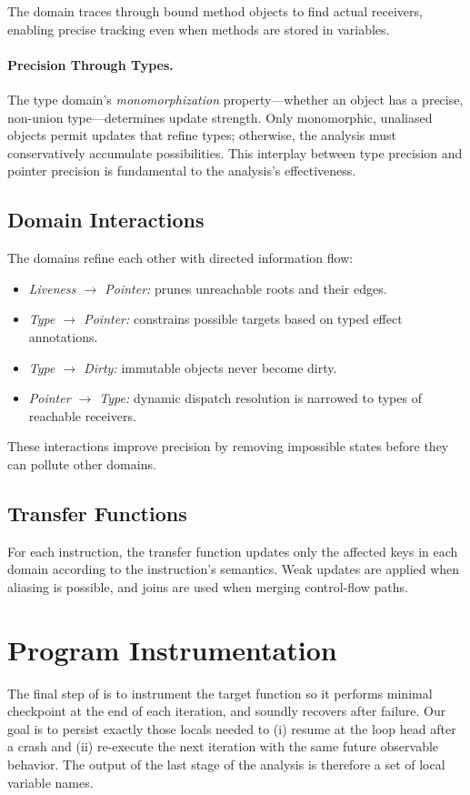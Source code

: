 The domain traces through bound method objects to find actual receivers, enabling precise tracking even when methods are stored in variables.

\paragraph{Precision Through Types.}
The type domain's \emph{monomorphization} property---whether an object has a precise, non-union type---determines update strength. Only monomorphic, unaliased objects permit updates that refine types; otherwise, the analysis must conservatively accumulate possibilities. This interplay between type precision and pointer precision is fundamental to the analysis's effectiveness.

\subsection{Domain Interactions}
The domains refine each other with directed information flow:
\begin{itemize}
    \item \emph{Liveness $\rightarrow$ Pointer:} prunes unreachable roots and their edges.
    \item \emph{Type $\rightarrow$ Pointer:} constrains possible targets based on typed effect annotations.
    \item \emph{Type $\rightarrow$ Dirty:} immutable objects never become dirty.
    \item \emph{Pointer $\rightarrow$ Type:} dynamic dispatch resolution is narrowed to types of reachable receivers.
\end{itemize}
These interactions improve precision by removing impossible states before they can pollute other domains.

\subsection{Transfer Functions}
For each instruction, the transfer function updates only the affected keys in each domain according to the instruction's semantics. Weak updates are applied when aliasing is possible, and joins are used when merging control-flow paths.


\section{Program Instrumentation}
\label{sec:min-persist}

The final step of \spyte is to instrument the target function so it performs minimal checkpoint at the end of each iteration, and soundly recovers after failure. Our goal is to persist exactly those locals needed to (i) resume at the loop head after a crash and (ii) re-execute the next iteration with the same future observable behavior. The output of the last stage of the analysis is therefore a set of local variable names.


